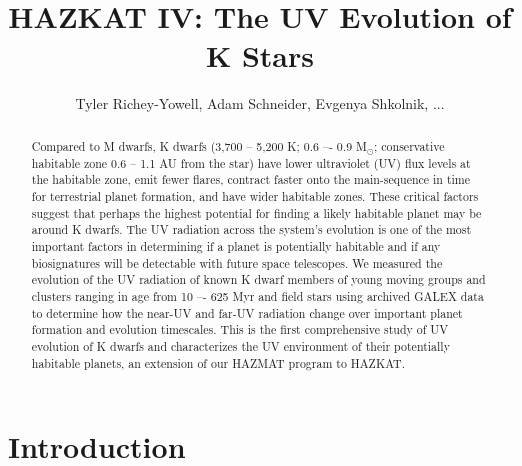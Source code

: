 \documentclass[preprint2]{aastex62}
\begin{document}
\title{HAZKAT IV: The UV Evolution of K Stars}

\author{Tyler Richey-Yowell, Adam Schneider, Evgenya Shkolnik, ...}

\begin{abstract}

Compared to M dwarfs, K dwarfs (3,700 -- 5,200 K; 0.6 –- 0.9 M$_{\odot}$; conservative habitable zone 0.6 -- 1.1 AU from the star) have lower ultraviolet (UV) flux levels at the habitable zone, emit fewer flares, contract faster onto the main-sequence in time for terrestrial planet formation, and have wider habitable zones. These critical factors suggest that perhaps the highest potential for finding a likely habitable planet may be around K dwarfs. The UV radiation across the system’s evolution is one of the most important factors in determining if a planet is potentially habitable and if any biosignatures will be detectable with future space telescopes. We measured the evolution of the UV radiation of known K dwarf members of young moving groups and clusters ranging in age from 10 –- 625 Myr and field stars using archived GALEX data to determine how the near-UV and far-UV radiation change over important planet formation and evolution timescales. This is the first comprehensive study of UV evolution of K dwarfs and characterizes the UV environment of their potentially habitable planets, an extension of our HAZMAT program to HAZKAT.

\end{abstract}


\section{Introduction}\label{sec:intro}
\end{document}
